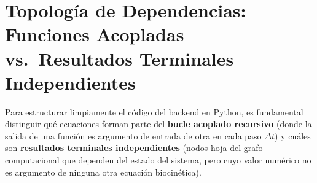 \documentclass[11pt,letterpaper]{article}
\begin{document}
\newpage
\section{Topología de Dependencias: Funciones Acopladas vs.\ Resultados Terminales Independientes}

Para estructurar limpiamente el código del backend en Python, es fundamental distinguir qué ecuaciones forman parte del \textbf{bucle acoplado recursivo} (donde la salida de una función es argumento de entrada de otra en cada paso $\Delta t$) y cuáles son \textbf{resultados terminales independientes} (nodos hoja del grafo computacional que dependen del estado del sistema, pero cuyo valor numérico no es argumento de ninguna otra ecuación biocinética).
\end{document}
